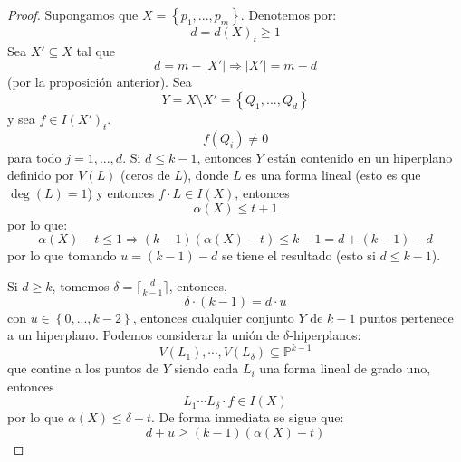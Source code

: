 \documentclass[12pt]{report}
\theoremstyle{largebreak}
\newcommand\abs[1]{\ensuremath{\left|#1\right|}}
\begin{document}
    \begin{proof}
        Supongamos que $X=\left\{p_1,...,p_m \right\}$. Denotemos por:
        \begin{equation*}
            d=d(X)_t\geq1
        \end{equation*}
        Sea $X'\subseteq X$ tal que
        \begin{equation*}
            d=m-\abs{X'}\Rightarrow\abs{X'}=m-d
        \end{equation*}
        (por la proposición anterior). Sea
        \begin{equation*}
            Y=X\setminus X'=\left\{Q_1,...,Q_d \right\}
        \end{equation*}
        y sea $f\in I(X')_t$.
        \begin{equation*}
            f(Q_i)\neq0
        \end{equation*}
        para todo $j=1,...,d$. Si $d\leq k-1$, entonces $Y$ están contenido en un hiperplano definido por $V(L)$ (ceros de $L$), donde $L$ es una forma lineal (esto es que $\deg(L)=1$) y entonces $f\cdot L\in I(X)$, entonces
        \begin{equation*}
            \alpha(X)\leq t+1
        \end{equation*}
        por lo que:
        \begin{equation*}
            \alpha(X)-t\leq 1\Rightarrow (k-1)(\alpha(X)-t)\leq k-1=d+(k-1)-d
        \end{equation*}
        por lo que tomando $u=(k-1)-d$ se tiene el resultado (esto si $d\leq k-1$).

        Si $d\geq k$, tomemos $\delta=\lceil\frac{d}{k-1}\rceil$, entonces,
        \begin{equation*}
            \delta\cdot(k-1)=d\cdot u
        \end{equation*}
        con $u\in\left\{0,...,k-2 \right\}$, entonces cualquier conjunto $Y$ de $k-1$ puntos pertenece a un hiperplano. Podemos considerar la unión de $\delta$-hiperplanos:
        \begin{equation*}
            V(L_1),\cdots,V(L_\delta)\subseteq\mathbb{P}^{k-1}
        \end{equation*}
        que contine a los puntos de $Y$ siendo cada $L_i$ una forma lineal de grado uno, entonces
        \begin{equation*}
            L_1\cdots L_\delta\cdot f\in I(X)
        \end{equation*}
        por lo que $\alpha(X)\leq \delta+t$. De forma inmediata se sigue que:
        \begin{equation*}
            d+u\geq(k-1)(\alpha(X)-t)
        \end{equation*}
    \end{proof}
\end{document}
